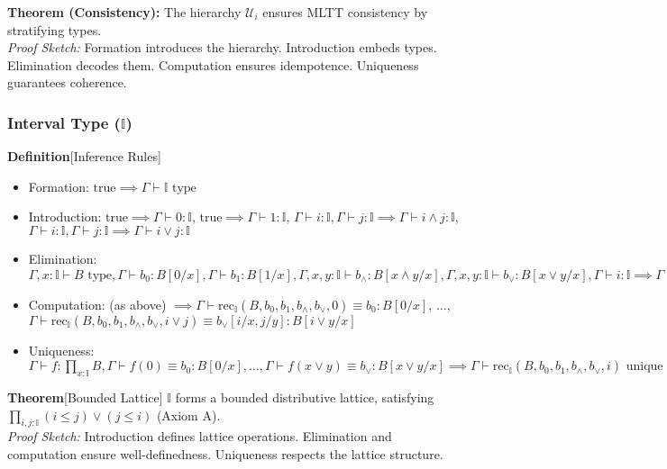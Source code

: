 \documentclass{article}
\begin{document}
\textbf{Theorem (Consistency):}
The hierarchy $\mathcal{U}_i$ ensures MLTT consistency by stratifying types. \\
\textit{Proof Sketch:} Formation introduces the hierarchy. Introduction embeds types. Elimination decodes them. Computation ensures idempotence. Uniqueness guarantees coherence.

\subsubsection{Interval Type ($\mathbb{I}$)}
\textbf{Definition}[Inference Rules]
\begin{itemize}
    \item Formation: $\text{true} \implies \Gamma \vdash \mathbb{I} \text{ type}$
    \item Introduction: $\text{true} \implies \Gamma \vdash 0 : \mathbb{I}$, $\text{true} \implies \Gamma \vdash 1 : \mathbb{I}$, $\Gamma \vdash i : \mathbb{I}, \Gamma \vdash j : \mathbb{I} \implies \Gamma \vdash i \wedge j : \mathbb{I}$, $\Gamma \vdash i : \mathbb{I}, \Gamma \vdash j : \mathbb{I} \implies \Gamma \vdash i \vee j : \mathbb{I}$
    \item Elimination: $\Gamma, x : \mathbb{I} \vdash B \text{ type}, \Gamma \vdash b_0 : B[0 / x], \Gamma \vdash b_1 : B[1 / x], \Gamma, x, y : \mathbb{I} \vdash b_\wedge : B[x \wedge y / x], \Gamma, x, y : \mathbb{I} \vdash b_\vee : B[x \vee y / x], \Gamma \vdash i : \mathbb{I} \implies \Gamma \vdash \text{rec}_{\mathbb{I}}(B, b_0, b_1, b_\wedge, b_\vee, i) : B[i / x]$
    \item Computation: (as above) $\implies \Gamma \vdash \text{rec}_{\mathbb{I}}(B, b_0, b_1, b_\wedge, b_\vee, 0) \equiv b_0 : B[0 / x]$, $\ldots$, $\Gamma \vdash \text{rec}_{\mathbb{I}}(B, b_0, b_1, b_\wedge, b_\vee, i \vee j) \equiv b_\vee[i / x, j / y] : B[i \vee y / x]$
    \item Uniqueness: $\Gamma \vdash f : \prod_{x : \mathbb{I}} B, \Gamma \vdash f(0) \equiv b_0 : B[0 / x], \ldots, \Gamma \vdash f(x \vee y) \equiv b_\vee : B[x \vee y / x] \implies \Gamma \vdash \text{rec}_{\mathbb{I}}(B, b_0, b_1, b_\wedge, b_\vee, i) \text{ unique up to } \equiv$
\end{itemize}

\textbf{Theorem}[Bounded Lattice]
$\mathbb{I}$ forms a bounded distributive lattice, satisfying $\prod_{i,j : \mathbb{I}} (i \leq j) \vee (j \leq i)$ (Axiom A). \\
\textit{Proof Sketch:} Introduction defines lattice operations. Elimination and computation ensure well-definedness. Uniqueness respects the lattice structure.
\end{document}
